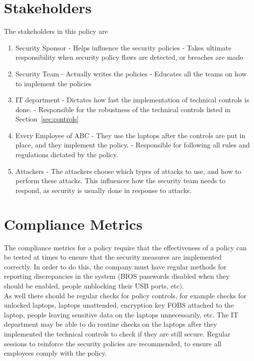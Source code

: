 \documentclass[paper=a4, fontsize=11pt]{scrartcl} %
\numberwithin{equation}{section} %
\numberwithin{figure}{section} %
\numberwithin{table}{section} %
\begin{document}
\section{Stakeholders}
\label{sec:stakeholders}
The stakeholders in this policy are 
\begin{enumerate}
	\item Security Sponsor
		\subitem - Helps influence the security policies
		\subitem - Takes ultimate responsibility when security policy flaws are detected, or breaches are made
	\item Security Team
		\subitem - Actually writes the policies
		\subitem - Educates all the teams on how to implement the policies
	\item IT department
		\subitem - Dictates how fast the implementation of technical controls is done.
		\subitem - Responsible for the robustness of the technical controls listed in Section~\ref{sec:controls}
	\item Every Employee of ABC
		\subitem - They use the laptops after the controls are put in place, and they implement the policy. 
		\subitem - Responsible for following all rules and regulations dictated by the policy.
	\item Attackers
		\subitem - The attackers choose which types of attacks to use, and how to perform these attacks.  This influences how the security team needs to respond, as security is usually done in response to attacks.  
\end{enumerate}
\section{Compliance Metrics}
The compliance metrics for a policy require that the effectiveness of a policy can be tested at times to ensure that the security measures are implemented correctly.  In order to do this, the company must have regular methods for reporting discrepancies in the system (BIOS passwords disabled when they should be enabled, people unblocking their USB ports, etc).\\

As well there should be regular checks for policy controls, for example checks for unlocked laptops, laptops unattended, encryption key FOBS attached to the laptop, people leaving sensitive data on the laptops unnecessarily, etc. The IT department may be able to do routine checks on the laptops after they implemented the technical controls to check if they are still secure.  Regular sessions to reinforce the security policies are recommended, to ensure all employees comply with the policy.
\end{document}
